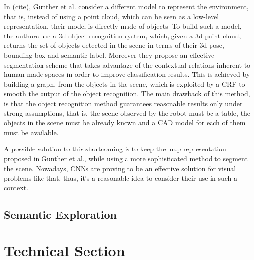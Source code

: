 \documentclass{article}
\begin{document}
	In (cite), Gunther et al. consider a different model to represent the environment, that is, instead of using a point cloud, which can be seen as a low-level representation, their model is directly made of objects. To build such a model, the authors use a 3d object recognition system, which, given a 3d point cloud, returns the set of objects detected in the scene in terms of their 3d pose, bounding box and semantic label. Moreover they propose an effective segmentation scheme that takes advantage of the contextual relations inherent to human-made spaces in order to improve classification results. This is achieved by building a graph, from the objects in the scene, which is exploited by a CRF to smooth the output of the object recognition. The main drawback of this method, is that the object recognition method guarantees reasonable results only under strong assumptions, that is, the scene observed by the robot must be a table, the objects in the scene must be already known and a CAD model for each of them must be available.
	
	A possible solution to this shortcoming is to keep the map representation proposed in Gunther et al., while using a more sophisticated method to segment the scene. Nowadays, CNNs are proving to be an effective solution for visual problems like that, thus, it's a reasonable idea to consider their use in such a context.
		
	\subsection*{Semantic Exploration}
	
	\section*{Technical Section}
	
%	
%	
	
\end{document}
